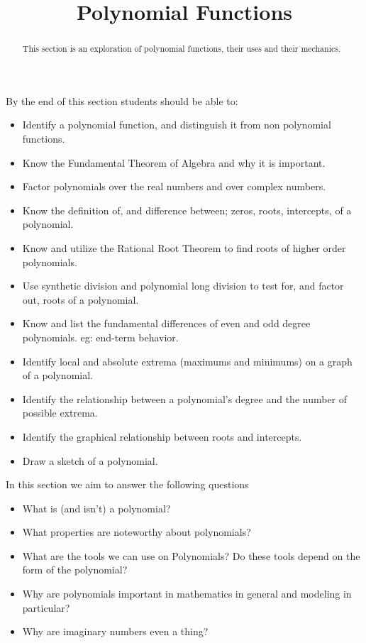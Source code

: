 \documentclass{ximeraXloud}
\title{Polynomial Functions}
\begin{document}
\begin{abstract}
    This section is an exploration of polynomial functions, their uses and their mechanics.
\end{abstract}
\maketitle
By the end of this section students should be able to:

\begin{itemize}
    \item Identify a polynomial function, and distinguish it from non polynomial functions.
    \item Know the Fundamental Theorem of Algebra and why it is important.
    \item Factor polynomials over the real numbers and over complex numbers.
    \item Know the definition of, and difference between; zeros, roots, intercepts, of a polynomial.
    \item Know and utilize the Rational Root Theorem to find roots of higher order polynomials.
    \item Use synthetic division and polynomial long division to test for, and factor out, roots of a polynomial.
    \item Know and list the fundamental differences of even and odd degree polynomials. eg: end-term behavior.
    \item Identify local and absolute extrema (maximums and minimums) on a graph of a polynomial.
    \item Identify the relationship between a polynomial's degree and the number of possible extrema.
    \item Identify the graphical relationship between roots and intercepts.
    \item Draw a sketch of a polynomial.
\end{itemize}


In this section we aim to answer the following questions

\begin{itemize}
    \item What is (and isn't) a polynomial?
    \item What properties are noteworthy about polynomials?
    \item What are the tools we can use on Polynomials? Do these tools depend on the form of the polynomial?
    \item Why are polynomials important in mathematics in general and modeling in particular?
    \item Why are imaginary numbers even a thing?
\end{itemize}
\end{document}
